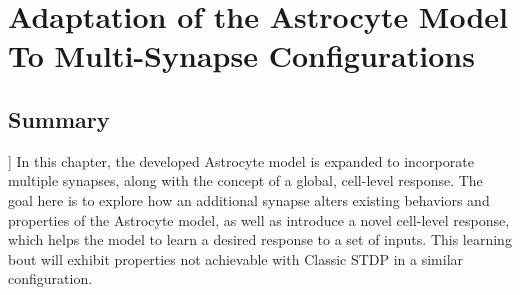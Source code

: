 \chapter{Adaptation of the Astrocyte Model To Multi-Synapse Configurations} \label{chapter:obj3}

\section{Summary}]
In this chapter, the developed Astrocyte model is expanded to incorporate
multiple synapses, along with the concept of a global, cell-level response. The
goal here is to explore how an additional synapse alters existing behaviors and
properties of the Astrocyte model, as well as introduce a novel cell-level
response, which helps the model to learn a desired response to a set of
inputs. This learning bout will exhibit properties not achievable with Classic
STDP in a similar configuration.
